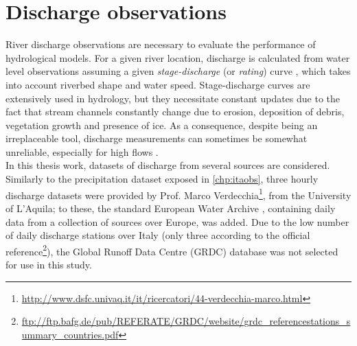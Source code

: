 \section{Discharge observations} \label{sec:disch_obs}
River discharge observations are necessary to evaluate the performance of hydrological models.
For a given river location, discharge is calculated from water level observations assuming a given \emph{stage-discharge} (or \emph{rating}) curve \citep{Braca2008}, which takes into account riverbed shape and water speed.
Stage-discharge curves are extensively used in hydrology, but they necessitate constant updates due to the fact that stream channels constantly change due to erosion, deposition of debris, vegetation growth and presence of ice.
As a consequence, despite being an irreplaceable tool, discharge measurements can sometimes be somewhat unreliable, especially for high flows \citep{DiBaldassarre2009}.\\ 
In this thesis work, datasets of discharge from several sources are considered. Similarly to the precipitation dataset exposed in \cref{chp:itaobs}, three hourly discharge datasets were provided by Prof. Marco Verdecchia\footnote{\url{http://www.dsfc.univaq.it/it/ricercatori/44-verdecchia-marco.html}}, from the University of L'Aquila; to these, the standard European Water Archive \citep{EWA2014}, containing daily data from a collection of sources over Europe, was added.
Due to the low number of daily discharge stations over Italy (only three according to the official reference\footnote{\url{ftp://ftp.bafg.de/pub/REFERATE/GRDC/website/grdc_referencestations_summary_countries.pdf}}), the Global Runoff Data Centre (GRDC) database was not selected for use in this study.
